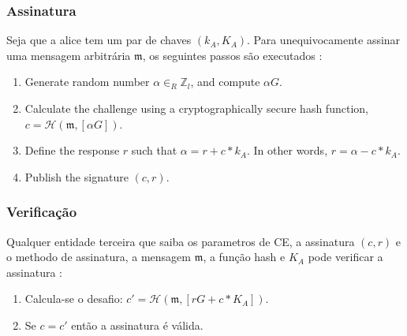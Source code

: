 
\iffalse

\subsubsection*{Assinatura}

Seja que a alice tem um par de chaves \((k_A, K_A)\). Para unequivocamente assinar uma mensagem arbitrária $\mathfrak{m}$, os seguintes passos são executados :


\begin{enumerate}
	\item Generate random number $\alpha \in_R \mathbb{Z}_l$, and compute $\alpha G$.
	\item Calculate the challenge using a cryptographically secure hash function, \(c = \mathcal{H}(\mathfrak{m},[\alpha G])\).
	\item Define the response $r$ such that $\alpha = r + c*k_A$. In other words, $r = \alpha - c*k_A$.
	\item Publish the signature $(c, r)$.
\end{enumerate}

\subsubsection*{Verificação}

Qualquer entidade terceira que saiba os parametros de CE, a assinatura $(c, r)$ e o methodo de assinatura, a mensagem $\mathfrak{m}$, a função hash e $K_A$ pode verificar a assinatura :


\begin{enumerate}
	\item Calcula-se o desafio: \(c' = \mathcal{H}(\mathfrak{m},[r G + c*K_A])\).
	\item Se $c = c'$ então a assinatura é válida.
\end{enumerate}

